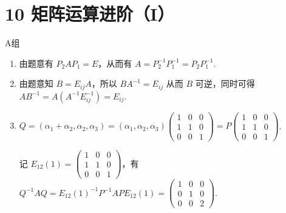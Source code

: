 \section*{10 矩阵运算进阶（I）}

\vspace{2ex}

\centerline{\heiti A组}
\begin{enumerate}
    \item 由题意有 $P_2AP_1 = E$，从而有 $A=P_2^{-1}P_1^{-1}=P_2P_1^{-1}$.

    \item 由题意知 $B = E_{ij}A$，所以 $BA^{-1}=E_{ij}$ 从而 $B$ 可逆，同时可得 $AB^{-1}=A(A^{-1}E_{ij}^{-1})=E_{ij}$.

    \item $Q = (\alpha_1+\alpha_2,\alpha_2,\alpha_3)=(\alpha_1,\alpha_2,\alpha_3)\begin{pmatrix}1 & 0 & 0 \\ 1 & 1 & 0 \\ 0 & 0 & 1\end{pmatrix}=P\begin{pmatrix}1 & 0 & 0 \\ 1 & 1 & 0 \\ 0 & 0 & 1\end{pmatrix}$.

    记 $E_{12}(1)=\begin{pmatrix}1 & 0 & 0 \\ 1 & 1 & 0 \\ 0 & 0 & 1\end{pmatrix}$，有 $Q^{-1}AQ=E_{12}(1)^{-1}P^{-1}APE_{12}(1)=\begin{pmatrix}1 & 0 & 0 \\ 0 & 1 & 0 \\ 0 & 0 & 2\end{pmatrix}$.


\end{enumerate}
